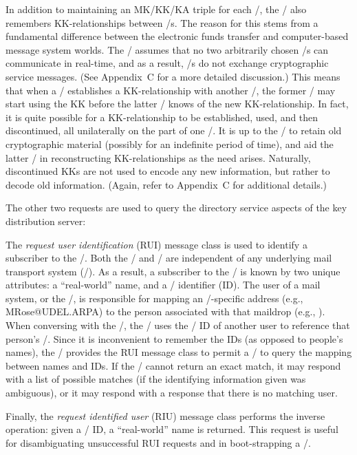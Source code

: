 In addition to maintaining an MK/KK/KA triple for each \TMA/,
the \KDS/ also remembers KK-relationships between \TMA/s.
The reason for this stems from a fundamental difference between the
electronic funds transfer and computer-based message system worlds.
The \KDS/ assumes that no two arbitrarily chosen \TMA/s can communicate in
real-time,
and as a result,
\TMA/s do not exchange cryptographic service messages.
(See Appendix~C for a more detailed discussion.)
This means that when a \TMA/ establishes a KK-relationship with another \TMA/,
the former \TMA/ may start using the KK before the latter \TMA/ knows of the
new KK-relationship.
In fact,
it is quite possible for a KK-relationship to be established,
used,
and then discontinued,
all unilaterally on the part of one \TMA/.
It is up to the \KDS/ to retain old cryptographic material
(possibly for an indefinite period of time),
and aid the latter \TMA/ in reconstructing KK-relationships as the need arises.
Naturally,
discontinued KKs are not used to encode any new information,
but rather to decode old information.
(Again, refer to Appendix~C for additional details.)

The other two requests are used to query the directory service aspects of the
key distribution server:

The {\it request user identification} (RUI) message class
is used to identify a subscriber to the \KDS/.
Both  the \KDS/ and \TMA/ are independent of any underlying mail transport
system (\MTS/).
As a result,
a subscriber to the \KDS/ is known by two unique attributes:
a ``real-world'' name,
and a \KDS/ identifier (ID).
The user of a mail system,
or the \UA/,
is responsible for mapping an \MTS/-specific address
(e.g., {\tx MRose@UDEL.ARPA})
to the person associated with that maildrop
(e.g., ).
When conversing with the \KDS/,
the \TMA/ uses the \KDS/ ID of another user to reference that person's \TMA/.
Since it is inconvenient to remember the IDs (as opposed to people's names),
the \KDS/ provides the RUI message class to permit a \TMA/ to query the
mapping between names and IDs.
If the \KDS/ cannot return an exact match,
it may respond with a list of possible matches
(if the identifying information given was ambiguous),
or it may respond with a response that there is no matching user.

Finally,
the {\it request identified user} (RIU) message class
performs the inverse operation:
given a \KDS/ ID, a ``real-world'' name is returned.
This request is useful for disambiguating unsuccessful RUI requests
and in boot-strapping a \TMA/.

